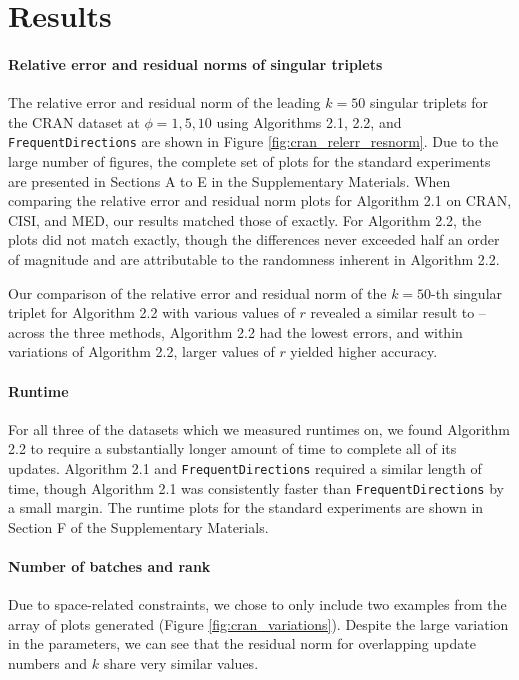 \section{Results} \label{sec:results}

\paragraph{Relative error and residual norms of singular triplets}

The relative error and residual norm of the leading $k=50$ singular triplets for the CRAN dataset at $\phi=1,5,10$ using Algorithms 2.1, 2.2, and \verb|FrequentDirections| are shown in Figure \ref{fig:cran_relerr_resnorm}. Due to the large number of figures, the complete set of plots for the standard experiments are presented in Sections A to E in the Supplementary Materials. When comparing the relative error and residual norm plots for Algorithm 2.1 on CRAN, CISI, and MED, our results matched those of \cite{Kalantzis2021} exactly. For Algorithm 2.2, the plots did not match exactly, though the differences never exceeded half an order of magnitude and are attributable to the randomness inherent in Algorithm 2.2. 



Our comparison of the relative error and residual norm of the $k=50$-th singular triplet for Algorithm 2.2 with various values of $r$ revealed a similar result to \cite{Kalantzis2021} – across the three methods, Algorithm 2.2 had the lowest errors, and within variations of Algorithm 2.2, larger values of $r$ yielded higher accuracy.



\paragraph{Runtime}

For all three of the datasets which we measured runtimes on, we found Algorithm 2.2 to require a substantially longer amount of time to complete all of its updates. Algorithm 2.1 and \verb|FrequentDirections| required a similar length of time, though Algorithm 2.1 was consistently faster than \verb|FrequentDirections| by a small margin. The runtime plots for the standard experiments are shown in Section F of the Supplementary Materials. 



\paragraph{Number of batches and rank} 

Due to space-related constraints, we chose to only include two examples from the array of plots generated (Figure \ref{fig:cran_variations}). Despite the large variation in the parameters, we can see that the residual norm for overlapping update numbers and $k$ share very similar values.



